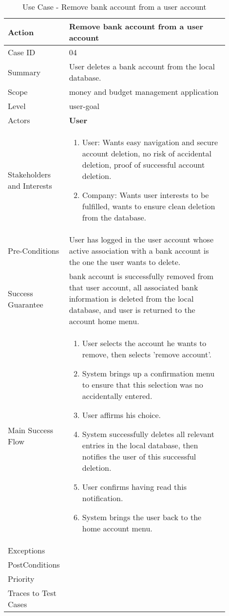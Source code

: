 \documentclass[11pt]{article}
\newcounter{use case ID}
\newcommand\tabularhead[1]{
\begin{table}[ht]
    \addtocounter{use case ID}{1}
    \caption{Use Case \arabic{use case ID} - #1}
    \vspace{0.2cm}
    \begin{tabular}{|p{0.2\linewidth}|p{0.70\linewidth}|}
    \hline
        \textbf{Action} & \textbf{#1} \\
        \hline}
\newcommand\addrow[2]{#1 & #2\\ \hline}
\newcommand\addmulrow[2]{ \begin{minipage}[t][][t]{2.5cm}#1\end{minipage}
        &\begin{minipage}[t][][t]{11cm}
        \begin{enumerate}[itemsep=-1ex] #2   \end{enumerate}
    \end{minipage}\vfill\\ \hline}
\newenvironment{usecase}{\tabularhead}
{\hline\end{tabular}\end{table}}
\begin{document}
\begin{usecase}{Remove bank account from a user account}
    \addrow{Case ID}{04}
    \addrow{Summary}{User deletes a bank account from the local database.}
    \addrow{Scope}{money and budget management application}
    \addrow{Level}{user-goal}
    \addrow{Actors}{\textbf{User}}
    \addmulrow{Stakeholders and Interests}{
        \item User: Wants easy navigation and secure account deletion, no risk of accidental deletion, proof of successful account deletion.
        \item Company: Wants user interests to be fulfilled, wants to ensure clean deletion from the database. }
    \addrow{Pre-Conditions}{User has logged in the user account whose active association with a bank account is the one the user wants to delete.}
    \addrow{Success Guarantee}{bank account is successfully removed from that user account, all associated bank information is deleted from the local database, and user is returned to the account home menu.}
    \addmulrow{Main Success Flow}{
        \item User selects the account he wants to remove, then selects 'remove account'.
        \item System brings up a confirmation menu to ensure that this selection was no accidentally entered.
        \item User affirms his choice.
        \item System successfully deletes all relevant entries in the local database, then notifies the user of this successful deletion.
        \item User confirms having read this notification.
        \item System brings the user back to the home account menu.}
    \addrow{Exceptions}{}
    \addrow{PostConditions}{}
    \addrow{Priority}{}
    \addrow{Traces to Test Cases}{}
\end{usecase}
\end{document}
